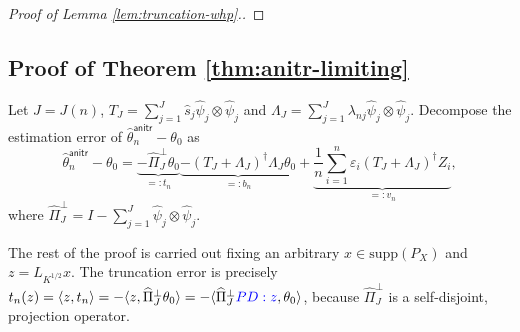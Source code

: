 \documentclass[11pt,a4paper]{article}
\renewcommand{\hat}{\widehat}
\theoremstyle{definition}
\theoremstyle{plain}
\theoremstyle{remark}
\newcommand{\supp}{\mathrm{supp}}
\newcommand{\ud}{\mathrm d}
\newcommand{\anitr}{\mathsf{anitr}}
\newcommand{\pd}[1]{
	{ \color{blue} PD: #1}
}
\begin{document}
\begin{proof}[Proof of Lemma \ref{lem:truncation-whp}.]
\end{proof}

\subsection{Proof of Theorem \ref{thm:anitr-limiting}}

Let $J=J(n)$, $T_J=\sum_{j=1}^J \hat s_j\hat\psi_j\otimes \hat\psi_j$ and $\Lambda_J=\sum_{j=1}^J\lambda_{nj}\hat\psi_j\otimes\hat\psi_j$.
Decompose the estimation error of $\hat\theta_n^\anitr-\theta_0$ as
\begin{equation}
\hat\theta_n^\anitr-\theta_0 = \underbrace{-\hat\Pi_J^\perp\theta_0}_{=:t_n} \underbrace{-(T_J+\Lambda_J)^\dagger \Lambda_J\theta_0}_{=: b_n} + \underbrace{\frac{1}{n}\sum_{i=1}^n\varepsilon_i (T_J+\Lambda_J)^\dagger Z_i}_{=:v_n},
\label{eq:anitr-decomp}
\end{equation}
where $\hat\Pi_J^\perp = I - \sum_{j=1}^J\hat\psi_j\otimes\hat\psi_j$.

The rest of the proof is carried out fixing an arbitrary $x\in\supp(P_X)$ and $z=L_{K^{1/2}}x$. 
The truncation error is precisely $t_n(z)=\langle z, t_n\rangle = -\langle z, \hat\Pi_J^\perp\theta_0\rangle = -\langle \hat\Pi_J^\perp \pd{z},\theta_0\rangle$, 
because $\hat\Pi_J^\perp$ is a self-disjoint, projection operator.
\end{document}
